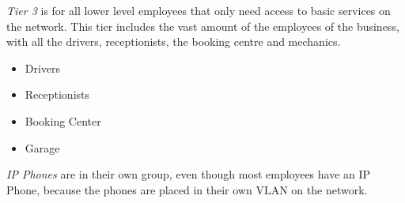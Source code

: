 \hfill

\emph{Tier 3} is for all lower level employees that only need access to basic services on the network. This tier includes the vast amount of the employees of the business, with all the drivers, receptionists, the booking centre and mechanics.
\begin{itemize}
    \item Drivers
    \item Receptionists
    \item Booking Center
    \item Garage
\end{itemize}

\emph{IP Phones} are in their own group, even though most employees have an IP Phone, because the phones are placed in their own VLAN on the network.

